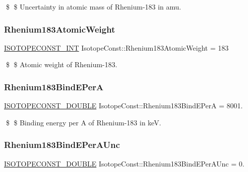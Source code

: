 \$ \$ Uncertainty in atomic mass of Rhenium-\/183 in amu. \mbox{\label{group___isotope_const-_rhenium-_re183_ga343c0b55aa8cd06b25304641afee03bf}} 
\subsubsection{\texorpdfstring{Rhenium183\+Atomic\+Weight}{Rhenium183AtomicWeight}}
{\footnotesize\ttfamily \mbox{\hyperlink{group___isotope_const-_macros_ga5f18360b3e99483a35c32d789e62621c}{I\+S\+O\+T\+O\+P\+E\+C\+O\+N\+S\+T\+\_\+\+I\+NT}} Isotope\+Const\+::\+Rhenium183\+Atomic\+Weight = 183}

\$ \$ Atomic weight of Rhenium-\/183. \mbox{\label{group___isotope_const-_rhenium-_re183_ga8c4bbb82564d77c7c891ca1ec545e6ee}} 
\subsubsection{\texorpdfstring{Rhenium183\+Bind\+E\+PerA}{Rhenium183BindEPerA}}
{\footnotesize\ttfamily \mbox{\hyperlink{group___isotope_const-_macros_ga8f45a7272ce02c0b4c65c44636ed719a}{I\+S\+O\+T\+O\+P\+E\+C\+O\+N\+S\+T\+\_\+\+D\+O\+U\+B\+LE}} Isotope\+Const\+::\+Rhenium183\+Bind\+E\+PerA = 8001.}

\$ \$ Binding energy per A of Rhenium-\/183 in keV. \mbox{\label{group___isotope_const-_rhenium-_re183_gafeaf19563a582327b8af96caaa2e5208}} 
\subsubsection{\texorpdfstring{Rhenium183\+Bind\+E\+Per\+A\+Unc}{Rhenium183BindEPerAUnc}}
{\footnotesize\ttfamily \mbox{\hyperlink{group___isotope_const-_macros_ga8f45a7272ce02c0b4c65c44636ed719a}{I\+S\+O\+T\+O\+P\+E\+C\+O\+N\+S\+T\+\_\+\+D\+O\+U\+B\+LE}} Isotope\+Const\+::\+Rhenium183\+Bind\+E\+Per\+A\+Unc = 0.}

